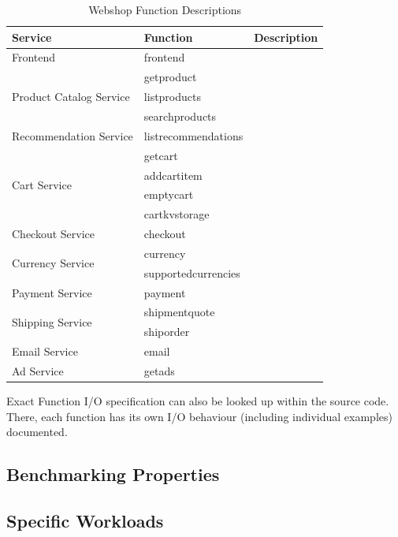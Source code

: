 \documentclass[../main.tex]{subfiles}
\begin{document}
\begin{longtable}{l l l} 
  \caption[Webshop Function Descriptions]{Webshop Function Descriptions\vspace*{1mm}}\label{tab:requiredTools}\\
  \textbf{Service} & \textbf{Function} &  \textbf{Description}\\ 
  \toprule
  Frontend                                & frontend            & \\
  \midrule[0.02em]
  \multirow{3}{*}{Product Catalog Service}& getproduct          &\\
                                          & listproducts        &\\
                                          & searchproducts      &\\
  \midrule[0.02em]
  Recommendation Service                  & listrecommendations &\\
  \midrule[0.02em]
  \multirow{4}{*}{Cart Service}           & getcart             &  \\
                                          & addcartitem         &  \\
                                          & emptycart           &  \\
                                          & cartkvstorage       &  \\
  \midrule[0.02em]
  Checkout Service                        & checkout            &\\
  \midrule[0.02em]
  \multirow{2}{*}{Currency Service}       & currency            &\\
                                          & supportedcurrencies &\\
  \midrule[0.02em]
  Payment Service                         & payment             & \\
  \midrule[0.02em]
  \multirow{2}{*}{Shipping Service}       & shipmentquote       &\\
                                          & shiporder           &\\
  \midrule[0.02em]
  Email Service                           & email               &\\
  \midrule[0.02em]
  Ad Service                              & getads              &\\
  \bottomrule
\end{longtable}

Exact Function I/O specification can also be looked up within the source code\footnotemark.
There, each function has its own I/O behaviour (including individual examples) documented.



\subsection{Benchmarking Properties}\label{ssec:webshopApplicationProperties}


\subsection{Specific Workloads}\label{ssec:webshopSpecificWorkloads}
\end{document}
